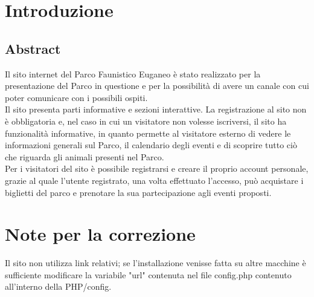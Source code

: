\section{Introduzione}

\subsection{Abstract}
Il sito internet del Parco Faunistico Euganeo è stato realizzato per la presentazione del Parco in questione e per la possibilità di avere un canale con cui poter comunicare con i possibili ospiti.\\
Il sito presenta parti informative e sezioni interattive. La registrazione al sito non è obbligatoria e, nel caso in cui un visitatore non volesse iscriversi, il sito ha funzionalità informative, in quanto permette al visitatore esterno di vedere le informazioni generali sul Parco, il calendario degli eventi e di scoprire tutto ciò che riguarda gli animali presenti nel Parco.\\
Per i visitatori del sito è possibile registrarsi e creare il proprio account personale, grazie al quale l'utente registrato, una volta effettuato l'accesso, può acquistare i biglietti del parco e prenotare la sua partecipazione agli eventi proposti.\\


\section{Note per la correzione}
Il sito non utilizza link relativi; se l’installazione venisse fatta su altre macchine è sufficiente modificare la variabile "url" contenuta nel file config.php contenuto all'interno della PHP/config.

\pagebreak